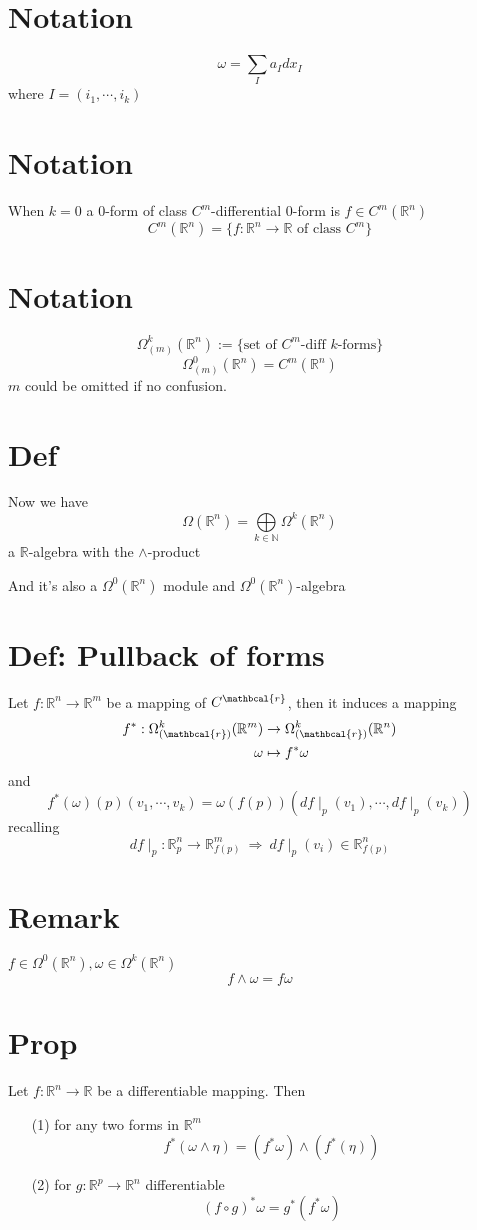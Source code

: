\documentclass{article}
\begin{document}
\section{Notation}
$$\omega=\sum\limits_{I}a_Idx_I$$
where $I=(i_1,\cdots,i_k)$
\section{Notation}
When $k=0$ a $0$-form of class $C^m$-differential 0-form is $f\in C^m(\mathbb{R}^n)$$$C^m(\mathbb{R}^n)=\{f:\mathbb{R}^n\rightarrow \mathbb{R}\text{ of class }C^m\}$$
\section{Notation}
$$\Omega^k_{(m)}(\mathbb{R}^n):=\{\text{set of }C^m\text{-diff }k\text{-forms}\}$$
$$\Omega^0_{(m)}(\mathbb{R}^n)=C^m(\mathbb{R}^n)$$
$m$ could be omitted if no confusion.
\section{Def}
Now we have $$\Omega(\mathbb{R}^n)=\bigoplus\limits_{k\in \mathbb{N}}\Omega^k(\mathbb{R}^n)$$ a $\mathbb{R}$-algebra with the $\wedge$-product

And it's also a $\Omega^0(\mathbb{R}^n)$ module and $\Omega^0(\mathbb{R}^n)$-algebra

\section{Def: Pullback of forms}
Let $f:\mathbb{R}^n\rightarrow \mathbb{R}^m$ be a mapping of $C^\mathbcal{r}$, then it induces a mapping 
$$\begin{aligned}
    f^*:\Omega^k_{(\mathbcal{r})}(\mathbb{R}^m)&\rightarrow\Omega^k_{(\mathbcal{r})}(\mathbb{R}^n)\\\omega&\mapsto f^*\omega
\end{aligned}$$
and $$f^*(\omega)(p)(v_1,\cdots,v_k)=\omega(f(p))(df\mid_p(v_1),\cdots,df\mid_p(v_k))$$
recalling$$df\mid_p:\mathbb{R}^n_p\rightarrow\mathbb{R}^m_{f(p)}\ \Rightarrow\ df\mid_p(v_i)\in \mathbb{R}^n_{f(p)}$$
\section{Remark}
$f\in \Omega^0(\mathbb{R}^n),\omega\in \Omega^k(\mathbb{R}^n)$$$f\wedge\omega=f\omega$$
\section{Prop}
Let $f:\mathbb{R}^n\rightarrow\mathbb{R}$ be a differentiable mapping. Then
\begin{itemize}
    \item [(1)]for any two forms in $\mathbb{R}^m$$$f^*(\omega\wedge\eta)=(f^*\omega)\wedge(f^*(\eta))$$
    \item [(2)]for $g:\mathbb{R}^p\rightarrow\mathbb{R}^n$ differentiable$$(f\circ g)^*\omega=g^*(f^*\omega)$$
\end{itemize}
\end{document}
